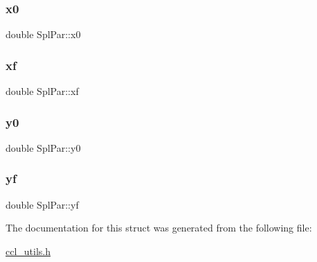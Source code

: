 \subsubsection{\texorpdfstring{x0}{x0}}
{\footnotesize\ttfamily double Spl\+Par\+::x0}

\mbox{\label{struct_spl_par_a81d8596b683922ed144fd8766e01f3f3}} 
\subsubsection{\texorpdfstring{xf}{xf}}
{\footnotesize\ttfamily double Spl\+Par\+::xf}

\mbox{\label{struct_spl_par_a49d3136602dec3eff0bfd5c631615cb0}} 
\subsubsection{\texorpdfstring{y0}{y0}}
{\footnotesize\ttfamily double Spl\+Par\+::y0}

\mbox{\label{struct_spl_par_a3e483146b3649beeaa42e854f7b7a386}} 
\subsubsection{\texorpdfstring{yf}{yf}}
{\footnotesize\ttfamily double Spl\+Par\+::yf}



The documentation for this struct was generated from the following file\+:\begin{DoxyCompactItemize}
\item 
\mbox{\hyperlink{ccl__utils_8h}{ccl\+\_\+utils.\+h}}\end{DoxyCompactItemize}
